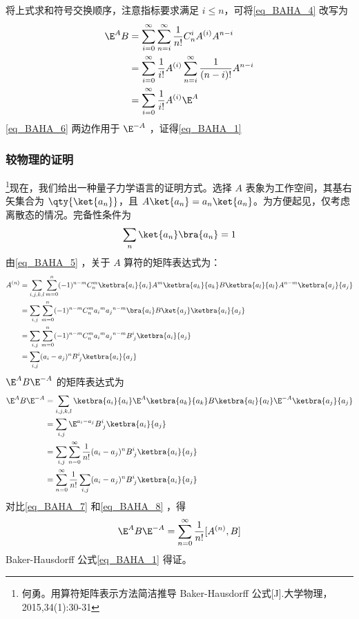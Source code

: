 将上式求和符号交换顺序，注意指标要求满足 $i\leq n$，可将\autoref{eq_BAHA_4} 改写为
\begin{equation}\label{eq_BAHA_6}
\begin{aligned}
\E^A B&=\sum_{i=0}^{\infty}\sum_{n=i}^{\infty}\frac{1}{n!}C_{n}^iA^{(i)}A^{n-i}\\
&=\sum_{i=0}^{\infty}\frac{1}{i!}A^{(i)}\sum_{n=i}^{\infty}\frac{1}{(n-i)!}A^{n-i}\\
&=\sum_{i=0}^{\infty}\frac{1}{i!}A^{(i)}\E^A
\end{aligned}
\end{equation}
\autoref{eq_BAHA_6} 两边作用于 $\E^{-A}$ ，证得\autoref{eq_BAHA_1} 

\subsubsection{较物理的证明}
\footnote{何勇。用算符矩阵表示方法简洁推导 Baker-Hausdorff 公式[J].大学物理，2015,34(1):30-31}现在，我们给出一种量子力学语言的证明方式。选择 $A$ 表象为工作空间，其基右矢集合为 $\qty{\ket{a_n}}$，且 $A\ket{a_n}=a_n\ket{a_n}$。为方便起见，仅考虑离散态的情况。完备性条件为
\begin{equation}
\sum_{n}\ket{a_n}\bra{a_n}=1
\end{equation}
由\autoref{eq_BAHA_5} ，关于 $A$ 算符的矩阵表达式为：
\begin{equation}\label{eq_BAHA_7}
\begin{aligned}
A^{(n)}&=\sum_{i,j,k,l}\sum_{m=0}^{n}(-1)^{n-m}C_{n}^{m}\ketbra{a_i}{a_i}A^m\ketbra{a_k}{a_k}B\ketbra{a_l}{a_l}A^{n-m}\ketbra{a_j}{a_j}\\
&=\sum_{i,j}\sum_{m=0}^{n}(-1)^{n-m}C_n^m{a_i}^m{a_j}^{n-m}\bra{a_i}B\ket{a_j}\ketbra{a_i}{a_j}\\
&=\sum_{i,j}\sum_{m=0}^{n}(-1)^{n-m}C_n^m{a_i}^m{a_j}^{n-m}B^i_{\; j}\ketbra{a_i}{a_j}\\
&=\sum_{i,j}(a_i-a_j)^nB^i_{\; j}\ketbra{a_i}{a_j}
\end{aligned}
\end{equation}
$\E^{A}B\E^{-A}$ 的矩阵表达式为
\begin{equation}\label{eq_BAHA_8}
\begin{aligned}
\E^{A}B\E^{-A}&=\sum_{i,j,k,l}\ketbra{a_i}{a_i}\E^{A}\ketbra{a_k}{a_k}B\ketbra{a_l}{a_l}\E^{-A}\ketbra{a_j}{a_j}\\
&=\sum_{i,j}\E^{a_i-a_j}B^{i}_{\;j}\ketbra{a_i}{a_j}\\
&=\sum_{i,j}\sum_{n=0}^{\infty}\frac{1}{n!}(a_i-a_j)^nB^{i}_{\;j}\ketbra{a_i}{a_j}\\
&=\sum_{n=0}^{\infty}\frac{1}{n!}\sum_{i,j}(a_i-a_j)^nB^{i}_{\;j}\ketbra{a_i}{a_j}
\end{aligned}
\end{equation}
对比\autoref{eq_BAHA_7} 和\autoref{eq_BAHA_8} ，得
\begin{equation}
\E^{A}B\E^{-A}=\sum_{n=0}^{\infty}\frac{1}{n!}[A^{(n)},B]
\end{equation}
Baker-Hausdorff 公式\autoref{eq_BAHA_1} 得证。

